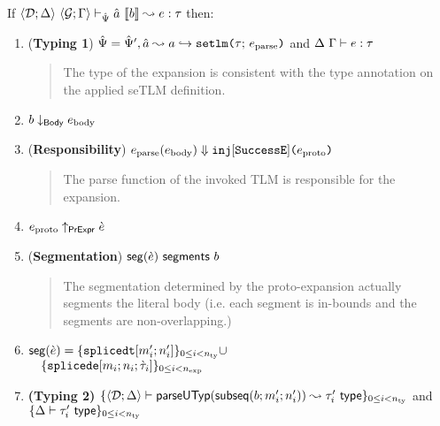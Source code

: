 \documentclass[acmsmall,review,anonymous]{acmart}\settopmatter{printfolios=true,printccs=false,printacmref=false}
\begin{document}
\begin{theorem}\label{thm:setlm-reasoning} ~\\
If $\langle \mathcal{D}; \Delta \rangle~\langle \mathcal{G}; \Gamma \rangle \vdash_{\hat{\Psi}} \hat{a}~\llbracket b\rrbracket \leadsto e : \tau$ then:
\begin{enumerate}[nolistsep]
\item (\textbf{Typing 1}) $\hat{\Psi} = \hat{\Psi}', \hat{a} \leadsto a \hookrightarrow \texttt{setlm}\texttt{(}\tau;\,e_\text{parse}\texttt{)}$ and $\Delta~\Gamma \vdash e : \tau$
  \begin{quote}
  \begin{grayparbox}
     The type of the expansion is consistent with the type annotation on the applied seTLM definition.
  \end{grayparbox}
  \end{quote}
\item $b \downarrow_\mathsf{Body} e_\text{body}$
\item (\textbf{Responsibility}) $e_\text{parse}(e_\text{body}) \Downarrow \texttt{inj}[\mathtt{SuccessE}]\texttt{(}e_\text{proto}\texttt{)}$
  \begin{quote}
  \begin{grayparbox}
  The parse function of the invoked TLM is responsible for the expansion.
  \end{grayparbox}
  \end{quote}
\item $e_\text{proto} \uparrow_\mathsf{PrExpr} \grave{e}$
\item (\textbf{Segmentation}) $\mathsf{seg}(\grave{e})~\mathsf{segments}~b$
        \begin{quote}
          \begin{grayparbox}
        The segmentation determined by the proto-expansion actually segments the literal body (i.e. each segment is in-bounds and the segments are non-overlapping.)
          \end{grayparbox}
\end{quote}
\item $\mathsf{seg}(\grave{e}) = \{\texttt{splicedt}[m'_i; n'_i]\}_{0 \leq i < n_\text{ty}} \cup$\\ $\quad\{\texttt{splicede}[m_i; n_i; \grave{\tau}_i]\}_{0 \leq i < n_\text{exp}}$
\item \textbf{(Typing 2)} $\{
      \langle \mathcal{D}; \Delta \rangle \vdash 
        \mathsf{parseUTyp}(\mathsf{subseq}(b; m'_i; n'_i))
       \leadsto \tau'_i~\mathsf{type}
    \}_{0 \leq i < n_\text{ty}}$ and $\{\Delta \vdash \tau'_i~\mathsf{type}\}_{0 \leq i < n_\text{ty}}$
      \begin{quote}
        \begin{grayparbox}


\end{grayparbox}
\end{quote}
\end{enumerate}
\end{theorem}
\end{document}
